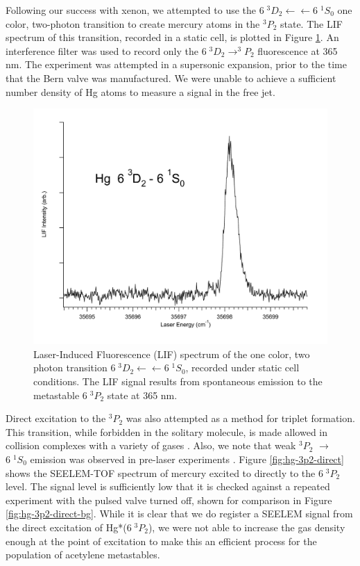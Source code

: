 \documentclass[12pt]{mitthesis}
\begin{document}
Following our success with xenon, we attempted to use the $6\;^3D_2
\leftarrow \leftarrow 6\;^1S_0$ one color, two-photon transition to
create mercury atoms in the $^3P_2$ state.  The LIF spectrum of this
transition, recorded in a static cell, is plotted in Figure
\ref{fig:hg3d2-cell}.  An interference filter was used to record only
the $6 \; ^3D_2 \rightarrow ^3P_2$ fluorescence at 365 nm.  The
experiment was attempted in a supersonic expansion, prior to the time
that the Bern valve was manufactured.  We were unable to achieve a
sufficient number density of Hg atoms to measure a signal in the free
jet.

\begin{figure}
  \caption{Laser-Induced Fluorescence (LIF) spectrum of the one color,
    two photon transition  $6\;^3D_2 \leftarrow \leftarrow
    6\;^1S_0$, recorded under static cell conditions.  The LIF signal
    results from spontaneous emission to the metastable $6\;^3P_2$
    state at 365 nm.}
  \label{fig:hg3d2-cell}
  \centering
  \vspace{1cm}
  \includegraphics[width=6in]{Hg3D2-cell.pdf}
  \vspace{1cm}
\end{figure}

Direct excitation to the $^3P_2$ was also attempted as a method for
triplet formation.  This transition, while forbidden in the solitary
molecule, is made allowed in collision complexes with a variety of
gases \cite{kurosawa98, amano98}.  Also, we note that weak $^3P_2$
$\rightarrow$ $6 \; ^1S_0$ emission was observed in pre-laser
experiments \cite{mrozowski45}.  Figure \ref{fig:hg-3p2-direct} shows
the SEELEM-TOF spectrum of mercury excited to directly to the $6 \;
^3P_2$ level.  The signal level is sufficiently low that it is checked
against a repeated experiment with the pulsed valve turned off, shown
for comparison in Figure \ref{fig:hg-3p2-direct-bg}.  While it is
clear that we do register a SEELEM signal from the direct excitation
of Hg*($6 \; ^3P_2$), we were not able to increase the gas density
enough at the point of excitation to make this an efficient process
for the population of acetylene metastables.
\end{document}
